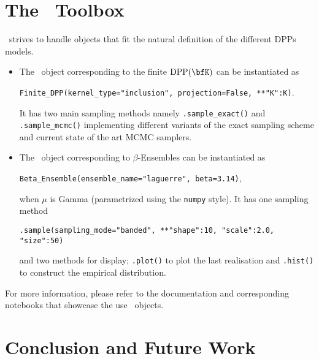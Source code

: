 \documentclass[twoside,11pt]{article}
\begin{document}


\section{The \DPPy\ Toolbox} %
\label{sec:the_dppy_toolbox}

  \DPPy\ strives to handle objects that fit the natural definition of the different DPPs models.
  \begin{itemize}
	  \item The \DPPy\ object corresponding to the finite $\DPP(\bfK)$ can be instantiated as
	  \begin{nscenter}
	  	\texttt{Finite_DPP(kernel_type="inclusion", projection=False, **{"K":K})}.
	  \end{nscenter}
		It has two main sampling methods namely \texttt{.sample_exact()} and \texttt{.sample_mcmc()} implementing different variants of the exact sampling scheme and current state of the art MCMC samplers.

		\item The \DPPy\ object corresponding to $\beta$-Ensembles can be instantiated as
		\begin{nscenter}
			\texttt{Beta_Ensemble(ensemble_name="laguerre", beta=3.14)},
		\end{nscenter}
		when $\mu$ is Gamma (parametrized using the \texttt{numpy} style).
		It has one sampling method
		\begin{nscenter}
			\texttt{.sample(sampling_mode="banded", **{"shape":10, "scale":2.0, "size":50})}
		\end{nscenter}
		and two methods for display; \texttt{.plot()} to plot the last realisation and \texttt{.hist()} to construct the empirical distribution.

  \end{itemize}

  For more information, please refer to the documentation and corresponding notebooks that showcase the use \DPPy\ objects.




\section{Conclusion and Future Work} %
\label{sec:conclusion_and_future_work}
\end{document}
